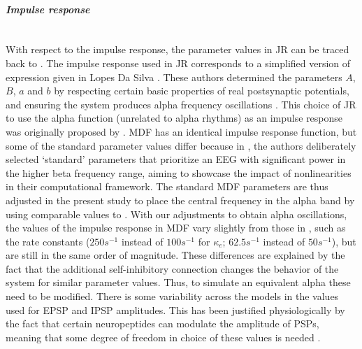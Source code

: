 \documentclass[12pt,twoside]{article}
\begin{document}
\paragraph{\textit{Impulse response}}~\\ 
With respect to the impulse response, the parameter values in JR can be traced back to \citet{van1982model}. The impulse response used in JR corresponds to a simplified version of expression given in Lopes Da Silva \citet{lopes1974model, da1976models}. These authors determined the parameters $A$, $B$, $a$ and $b$ by respecting certain basic properties of real postsynaptic potentials, and ensuring the system produces alpha frequency oscillations \citep{grimbert2006analysis}. This choice of JR to use the alpha function (unrelated to alpha rhythms) as an impulse response was originally proposed by \citet{rall1967distinguishing}. 
MDF has an identical impulse response function, but some of the standard parameter values differ because in \citet{moran2007neural}, the authors deliberately selected `standard' parameters that prioritize an EEG with significant power in the higher beta frequency range, aiming to showcase the impact of nonlinearities in their computational framework. The standard MDF parameters are thus adjusted in the present study to place the central frequency in the alpha band by using comparable values to \citet{david2003neural}. %
With our adjustments to obtain alpha oscillations, the values of the impulse response in MDF vary slightly from those in \cite{moran2007neural}, such as the rate constants ($250s^{-1}$ instead of $100s^{-1}$ for $\kappa_e$; $62.5s^{-1}$ instead of $50s^{-1}$), but are still in the same order of magnitude. These differences are explained by the fact that the additional self-inhibitory connection changes the behavior of the system for similar parameter values. Thus, to simulate an equivalent alpha these need to be modified.
There is some variability across the models in the values used for EPSP and IPSP amplitudes. This has been justified physiologically by the fact that certain neuropeptides can modulate the amplitude of PSPs, meaning that some degree of freedom in choice of these values is needed \citep{jansen1995electroencephalogram}.
\end{document}
